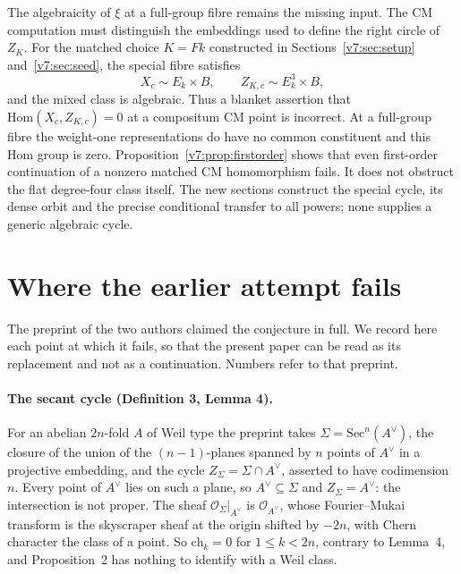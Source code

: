 \documentclass[11pt,reqno]{amsart}
\makeatletter
\renewcommand\subsection{\@startsection{subsection}{2}\z@{.6\linespacing\@plus.7\linespacing}{.3\linespacing}{\normalfont\bfseries}}
\numberwithin{equation}{section}
\theoremstyle{plain}
\theoremstyle{definition}
\newcommand{\Hom}{\mathrm{Hom}}
\newcommand{\ch}{\mathrm{ch}}
\makeatother
\begin{document}
\subsection{Where the link stops}\label{ssec:f2stop2}

The algebraicity of $\xi$ at a full-group fibre remains the missing input. The CM computation must distinguish the embeddings used to define the right circle of $Z_K$. For the matched choice $K=Fk$ constructed in Sections~\ref{v7:sec:setup} and~\ref{v7:sec:seed}, the special fibre satisfies
\[
 X_c\sim E_k\times B,\qquad Z_{K,c}\sim E_k^3\times B,
\]
and the mixed class is algebraic. Thus a blanket assertion that $\Hom(X_c,Z_{K,c})=0$ at a compositum CM point is incorrect. At a full-group fibre the weight-one representations do have no common constituent and this Hom group is zero. Proposition~\ref{v7:prop:firstorder} shows that even first-order continuation of a nonzero matched CM homomorphism fails. It does not obstruct the flat degree-four class itself. The new sections construct the special cycle, its dense orbit and the precise conditional transfer to all powers; none supplies a generic algebraic cycle.













\section{Where the earlier attempt fails}\label{sec:earlier}

The preprint \cite{BB26} of the two authors claimed the conjecture in full. We record here each point at which it fails, so that the present paper can be read as its replacement and not as a continuation. Numbers refer to that preprint.

\paragraph{The secant cycle (Definition 3, Lemma 4).} For an abelian $2n$-fold $A$ of Weil type the preprint takes $\Sigma=\mathrm{Sec}^{n}(A^{\vee})$, the closure of the union of the $(n-1)$-planes spanned by $n$ points of $A^{\vee}$ in a projective embedding, and the cycle $Z_{\Sigma}=\Sigma\cap A^{\vee}$, asserted to have codimension $n$. Every point of $A^{\vee}$ lies on such a plane, so $A^{\vee}\subseteq\Sigma$ and $Z_{\Sigma}=A^{\vee}$: the intersection is not proper. The sheaf $\mathcal{O}_{\Sigma}|_{A^{\vee}}$ is $\mathcal{O}_{A^{\vee}}$, whose Fourier--Mukai transform is the skyscraper sheaf at the origin shifted by $-2n$, with Chern character the class of a point. So $\ch_{k}=0$ for $1\le k<2n$, contrary to Lemma~4, and Proposition~2 has nothing to identify with a Weil class.
\end{document}
